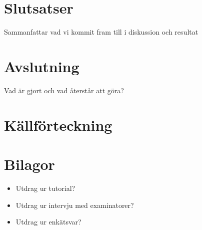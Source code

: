 \documentclass{article}
\begin{document}
\section{Slutsatser}
Sammanfattar vad vi kommit fram till i diskussion och resultat

\section{Avslutning}
Vad är gjort och vad återstår att göra?

\section{Källförteckning}

\section{Bilagor}
\begin{itemize}
\item Utdrag ur tutorial? 
\item Utdrag ur intervju med examinatorer?
\item Utdrag ur enkätsvar?
\end{itemize}
\end{document}
